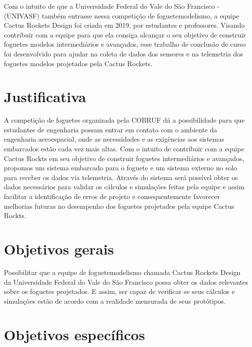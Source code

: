 Com o intuito de que a Universidade Federal do Vale do São Francisco -(UNIVASF) também entrasse nessa competição de foguetemodelismo, a equipe Cactus Rockets Design foi criada em 2019, por estudantes e professores. Visando contribuir com a equipe para que ela consiga alcançar o seu objetivo de construir foguetes modelos intermediários e avançados, esse trabalho de conclusão de curso foi desenvolvido para ajudar na coleta de dados dos sensores e na telemetria dos foguetes modelos projetados pela Cactus Rockets.




\newpage

\section{Justificativa}

A competição de foguetes organizada pela COBRUF dá a possibilidade para que estudantes de engenharia possam entrar em contato com o ambiente da engenharia aeroespacial, onde as necessidades e as exigências aos sistemas embarcados estão cada vez mais altas. Com o intuito de contribuir com a equipe Cactus Rockts em seu objetivo de construir foguetes intermediários e avançados, propomos um sistema embarcado para o foguete e um sistema externo no solo para receber os dados via telemetria. Através do sistema será possível obter os dados necessários para validar os cálculos e simulações feitas pela equipe e assim facilitar a identificação de erros de projeto e consequentemente favorecer melhorias futuras no desempenho dos foguetes projetados pela equipe Cactus Rockts.


\section{Objetivos gerais}

Possibilitar que a equipe de foguetemodelismo chamada Cactus Rockets Design da Universidade Federal do Vale do São Francisco possa obter os dados relevantes sobre os foguetes projetados. E assim, ser capaz de verificar se seus cálculos e simulações estão de acordo com a realidade mensurada de seus protótipos.



\section{Objetivos específicos}


